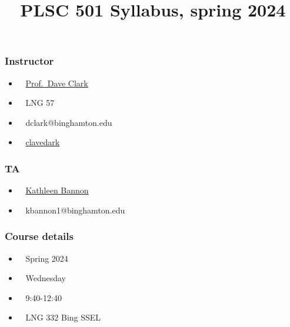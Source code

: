 \documentclass[
  letterpaper,
  DIV=11,
  numbers=noendperiod]{scrartcl}
\title{PLSC 501 Syllabus, spring 2024}
\author{}
\date{}
\providecommand{\tightlist}{%
  \setlength{\itemsep}{0pt}\setlength{\parskip}{0pt}}\usepackage{longtable,booktabs,array}
\begin{document}
\maketitle
\ifdefined\Shaded\renewenvironment{Shaded}{\begin{tcolorbox}[frame hidden, borderline west={3pt}{0pt}{shadecolor}, boxrule=0pt, interior hidden, breakable, enhanced, sharp corners]}{\end{tcolorbox}}\fi

\hypertarget{instructor}{%
\subsubsection{Instructor}\label{instructor}}

\begin{itemize}
\tightlist
\item
   ~ \href{https://clavedark.github.io}{Prof.~Dave Clark}
\item
   ~ LNG 57
\item
   ~ dclark@binghamton.edu
\item
   ~ \href{https://clavedark.github.io}{clavedark}
\end{itemize}

\hypertarget{ta}{%
\subsubsection{TA}\label{ta}}

\begin{itemize}
\tightlist
\item
   ~
  \href{https://www.linkedin.com/in/kathleen-bannon/}{Kathleen Bannon}
\item
   ~ kbannon1@binghamton.edu
\end{itemize}

\hypertarget{course-details}{%
\subsubsection{Course details}\label{course-details}}

\begin{itemize}
\tightlist
\item
   ~ Spring 2024
\item
   ~ Wednesday
\item
   ~ 9:40-12:40
\item
   ~ LNG 332 Bing SSEL
\end{itemize}
\end{document}

